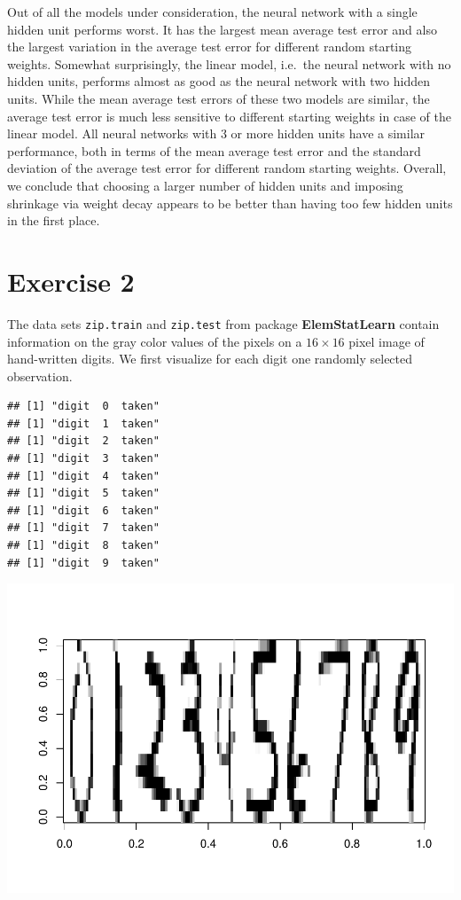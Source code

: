 \documentclass[
]{article}
\begin{document}
Out of all the models under consideration, the neural network with a
single hidden unit performs worst. It has the largest mean average test
error and also the largest variation in the average test error for
different random starting weights. Somewhat surprisingly, the linear
model, i.e.~the neural network with no hidden units, performs almost as
good as the neural network with two hidden units. While the mean average
test errors of these two models are similar, the average test error is
much less sensitive to different starting weights in case of the linear
model. All neural networks with 3 or more hidden units have a similar
performance, both in terms of the mean average test error and the
standard deviation of the average test error for different random
starting weights. Overall, we conclude that choosing a larger number of
hidden units and imposing shrinkage via weight decay appears to be
better than having too few hidden units in the first place.

\section{Exercise 2}\label{exercise-2}

The data sets \texttt{zip.train} and \texttt{zip.test} from package
\textbf{ElemStatLearn} contain information on the gray color values of
the pixels on a \(16 \times 16\) pixel image of hand-written digits. We
first visualize for each digit one randomly selected observation.

\begin{verbatim}
## [1] "digit  0  taken"
## [1] "digit  1  taken"
## [1] "digit  2  taken"
## [1] "digit  3  taken"
## [1] "digit  4  taken"
## [1] "digit  5  taken"
## [1] "digit  6  taken"
## [1] "digit  7  taken"
## [1] "digit  8  taken"
## [1] "digit  9  taken"
\end{verbatim}

\includegraphics{A4_files/figure-latex/unnamed-chunk-6-1.pdf}
\end{document}
